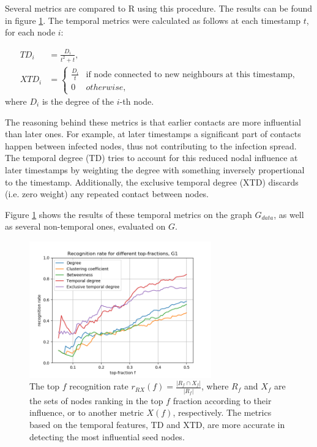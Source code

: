 \documentclass[letterpaper]{article}
\begin{document}
\noindent Several metrics are compared to R using this procedure. The results can be found in figure \ref{fig:rankG}. The temporal metrics were calculated as follows at each timestamp \(t\), for each node \(i\):

\begin{align*}
	TD_i &= \frac{D_i}{t^2+t},\\
	XTD_i &= 
		\begin{cases}
		\frac{D_i}{t}& \text{if node connected to new neighbours at this timestamp,}\\
		0& otherwise,
		\end{cases}
\end{align*}
\noindent where \(D_i\) is the degree of the \(i\)-th node.

The reasoning behind these metrics is that earlier contacts are more influential than later ones. For example, at later timestamps a significant part of contacts happen between infected nodes, thus not contributing to the infection spread. The temporal degree (TD) tries to account for this reduced nodal influence at later timestamps by weighting the degree with something inversely propertional to the timestamp. 
Additionally, the exclusive temporal degree (XTD) discards (i.e. zero weight) any repeated contact between nodes.

Figure \ref{fig:rankG} shows the results of these temporal metrics on the graph \(G_{data}\), as well as several non-temporal ones, evaluated on \(G\). 

\begin{figure}[ht]
  \centering
   \includegraphics[width=0.7\textwidth]{img/rankG.png}
   \caption{The top $f$ recognition rate $r_{RX}(f) = \frac{ |R_f \cap X_f| }{ |R_f| }$, where $R_f$ and $X_f$ are the sets of nodes ranking in the top $f$ fraction according to their influence,  or to another metric $X(f)$, respectively. The metrics based on the temporal features, TD and XTD, are more accurate in detecting the most influential seed nodes.}
   \label{fig:rankG}
\end{figure}
\end{document}

